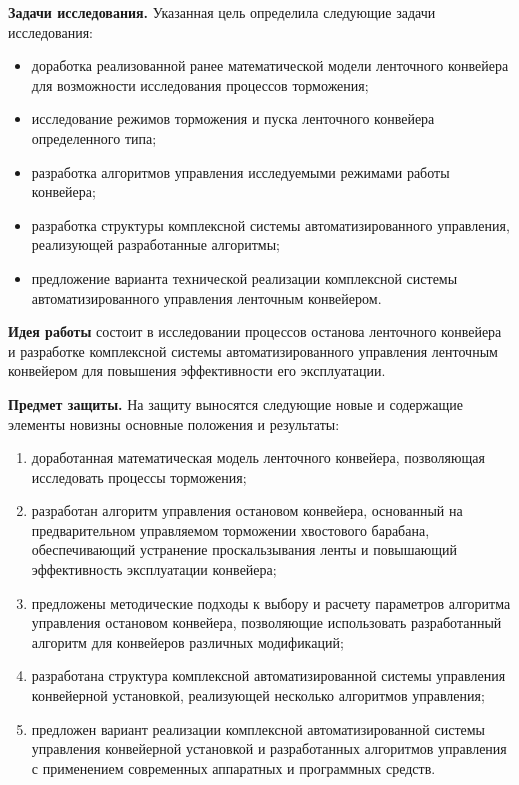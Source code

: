 \textbf{Задачи исследования.} Указанная цель определила следующие задачи исследования: 
\begin{itemize}
\item доработка реализованной ранее математической модели ленточного конвейера для возможности исследования процессов торможения;
\item исследование режимов торможения и пуска ленточного конвейера определенного типа;
\item разработка алгоритмов управления исследуемыми режимами работы конвейера;
\item разработка структуры комплексной системы автоматизированного управления, реализующей разработанные алгоритмы;
\item предложение варианта технической реализации комплексной системы автоматизированного управления ленточным конвейером.
\end{itemize}

\textbf{Идея работы} состоит в исследовании процессов останова ленточного конвейера и разработке комплексной системы автоматизированного управления ленточным конвейером для повышения эффективности его эксплуатации.
\bigskip

\textbf{Предмет защиты.} На защиту выносятся следующие новые и содержащие элементы новизны основные положения и результаты:
\begin{enumerate}
  \item доработанная математическая модель ленточного конвейера, позволяющая исследовать процессы торможения;
  \item разработан алгоритм управления остановом конвейера, основанный на предварительном управляемом торможении хвостового барабана, обеспечивающий устранение проскальзывания ленты и повышающий эффективность эксплуатации конвейера;
  \item предложены методические подходы к выбору и расчету параметров алгоритма управления остановом конвейера, позволяющие использовать разработанный алгоритм для конвейеров различных модификаций;
  \item разработана структура комплексной автоматизированной системы управления конвейерной установкой, реализующей несколько алгоритмов управления;
  \item предложен вариант реализации комплексной автоматизированной системы управления конвейерной установкой и разработанных алгоритмов управления с применением современных аппаратных и программных средств.
\end{enumerate}
\bigskip

